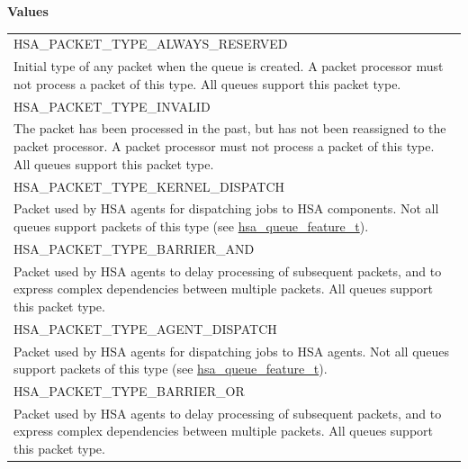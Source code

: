 \documentclass[final,oneside]{book}
\newcommand{\reftyp}[1]{#1}
\newcommand{\refenu}[1]{\reftyp{#1}}
\begin{document}
\noindent\textbf{Values}\\[-5mm]
\begin{longtable}{@{\hspace{2em}}p{\linewidth-2em}}
\hspace{-2em}\refenu{HSA_\-PACKET_\-TYPE_\-ALWAYS_\-RESERVED}\\Initial type of any packet when the queue is created. A packet processor must not process a packet of this type. All queues support this packet type.\\[2mm]
\hspace{-2em}\refenu{HSA_\-PACKET_\-TYPE_\-INVALID}\\The packet has been processed in the past, but has not been reassigned to the packet processor. A packet processor must not process a packet of this type. All queues support this packet type.\\[2mm]
\hspace{-2em}\refenu{HSA_\-PACKET_\-TYPE_\-KERNEL_\-DISPATCH}\\Packet used by HSA agents for dispatching jobs to HSA components. Not all queues support packets of this type (see \hyperlink{group__queue_1ga1145b01f6d9e2670179a22c92db39413}{hsa_\-queue_\-feature_\-t}).\\[2mm]
\hspace{-2em}\refenu{HSA_\-PACKET_\-TYPE_\-BARRIER_\-AND}\\Packet used by HSA agents to delay processing of subsequent packets, and to express complex dependencies between multiple packets. All queues support this packet type.\\[2mm]
\hspace{-2em}\refenu{HSA_\-PACKET_\-TYPE_\-AGENT_\-DISPATCH}\\Packet used by HSA agents for dispatching jobs to HSA agents. Not all queues support packets of this type (see \hyperlink{group__queue_1ga1145b01f6d9e2670179a22c92db39413}{hsa_\-queue_\-feature_\-t}).\\[2mm]
\hspace{-2em}\refenu{HSA_\-PACKET_\-TYPE_\-BARRIER_\-OR}\\Packet used by HSA agents to delay processing of subsequent packets, and to express complex dependencies between multiple packets. All queues support this packet type.
\end{longtable}
\end{document}
